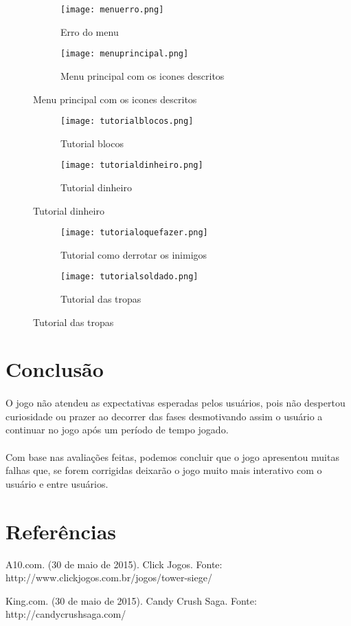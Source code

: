 \documentclass[12pt]{article}
\begin{document}
\begin{figure}[h]
\begin{subfigure}{0.5\textwidth}
\texttt{[image: menuerro.png]}
\caption{Erro do menu}
\label{fig:menuerro}
\end{subfigure}
\begin{subfigure}{0.5\textwidth}
\texttt{[image: menuprincipal.png]} 
\caption{Menu principal com os icones descritos}
\label{fig:menuprincipal}
\end{subfigure}
\end{figure}

\begin{figure}[h]
\begin{subfigure}{0.5\textwidth}
\texttt{[image: tutorialblocos.png]}
\caption{Tutorial blocos}
\label{fig:tutorialblocos}
\end{subfigure}
\begin{subfigure}{0.5\textwidth}
\texttt{[image: tutorialdinheiro.png]} 
\caption{Tutorial dinheiro}
\label{fig:tutorialdinheiro}
\end{subfigure}
\end{figure}

\begin{figure}[h]
\begin{subfigure}{0.5\textwidth}
\texttt{[image: tutorialoquefazer.png]}
\caption{Tutorial como derrotar os inimigos}
\label{fig:tutorialoquefazer}
\end{subfigure}
\begin{subfigure}{0.5\textwidth}
\texttt{[image: tutorialsoldado.png]} 
\caption{Tutorial das tropas}
\label{fig:tutorialsoldado}
\end{subfigure}
\end{figure}

\section{Conclusão}

\paragraph{} O jogo não atendeu as expectativas esperadas pelos usuários, pois não despertou curiosidade ou prazer ao decorrer das fases desmotivando assim o usuário a continuar no jogo após um período de tempo jogado.  \\
    
\paragraph{} Com base nas avaliações feitas, podemos concluir que o jogo apresentou muitas falhas que, se forem corrigidas deixarão o jogo muito mais interativo com o usuário e entre usuários.

\section{Referências}

A10.com. (30 de maio de 2015). Click Jogos. Fonte: http://www.clickjogos.com.br/jogos/tower-siege/

King.com. (30 de maio de 2015). Candy Crush Saga. Fonte: http://candycrushsaga.com/
\end{document}
